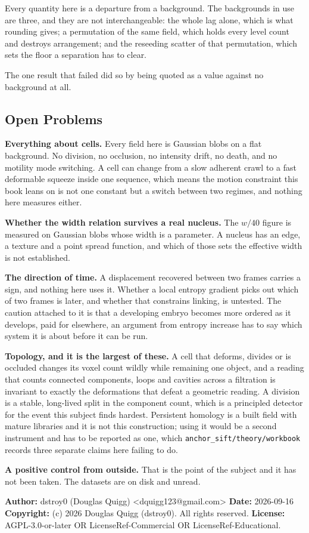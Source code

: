 Every quantity here is a departure from a background. The backgrounds in use are three, and they are
not interchangeable: the whole lag alone, which is what rounding gives; a permutation of the same
field, which holds every level count and destroys arrangement; and the reseeding scatter of that
permutation, which sets the floor a separation has to clear.

The one result that failed did so by being quoted as a value against no background at all.

\subsection{Open Problems}

\textbf{Everything about cells.} Every field here is Gaussian blobs on a flat background. No
division, no occlusion, no intensity drift, no death, and no motility mode switching. A cell can
change from a slow adherent crawl to a fast deformable squeeze inside one sequence, which means the
motion constraint this book leans on is not one constant but a switch between two regimes, and
nothing here measures either.

\textbf{Whether the width relation survives a real nucleus.} The $w/40$ figure is measured on
Gaussian blobs whose width is a parameter. A nucleus has an edge, a texture and a point spread
function, and which of those sets the effective width is not established.

\textbf{The direction of time.} A displacement recovered between two frames carries a sign, and
nothing here uses it. Whether a local entropy gradient picks out which of two frames is later, and
whether that constrains linking, is untested. The caution attached to it is that a developing embryo
becomes more ordered as it develops, paid for elsewhere, an argument from entropy increase has to
say which system it is about before it can be run.

\textbf{Topology, and it is the largest of these.} A cell that deforms, divides or is occluded
changes its voxel count wildly while remaining one object, and a reading that counts connected
components, loops and cavities across a filtration is invariant to exactly the deformations that
defeat a geometric reading. A division is a stable, long-lived split in the component count, which
is a principled detector for the event this subject finds hardest. Persistent homology is a built
field with mature libraries and it is not this construction; using it would be a second instrument
and has to be reported as one, which
\texttt{anchor\_sift/\allowbreak{}theory/\allowbreak{}workbook} records three separate claims here
failing to do.

\textbf{A positive control from outside.} That is the point of the subject and it has not been
taken. The datasets are on disk and unread.

\medskip

\textbf{Author:} dstroy0 (Douglas Quigg) <dquigg123@gmail.com> \textbf{Date:} 2026-09-16
\textbf{Copyright:} (c) 2026 Douglas Quigg (dstroy0). All rights reserved.
\textbf{License:} AGPL-3.0-or-later OR LicenseRef-Commercial OR LicenseRef-Educational.
